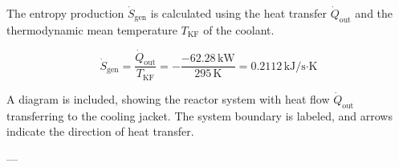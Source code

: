 The entropy production \( \dot{S}_{\text{gen}} \) is calculated using the heat transfer \( \dot{Q}_{\text{out}} \) and the thermodynamic mean temperature \( T_{\text{KF}} \) of the coolant.  

\[
\dot{S}_{\text{gen}} = \frac{\dot{Q}_{\text{out}}}{T_{\text{KF}}} = -\frac{-62.28 \, \text{kW}}{295 \, \text{K}} = 0.2112 \, \text{kJ/s·K}
\]

A diagram is included, showing the reactor system with heat flow \( \dot{Q}_{\text{out}} \) transferring to the cooling jacket. The system boundary is labeled, and arrows indicate the direction of heat transfer.  

---